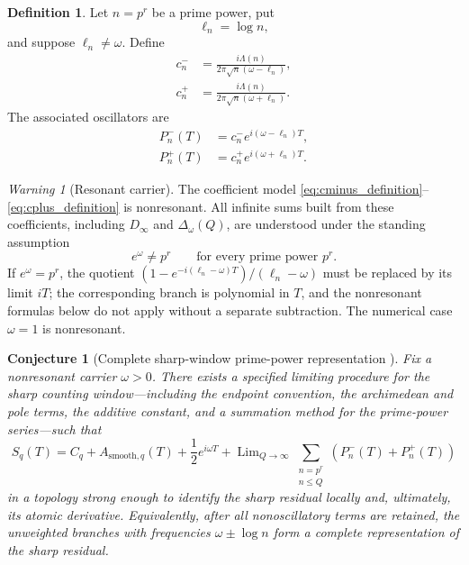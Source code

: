 \documentclass[11pt]{amsart}
\numberwithin{equation}{section}
\theoremstyle{plain}
\newtheorem{conjecture}[theorem]{Conjecture}
\theoremstyle{definition}
\newtheorem{definition}[theorem]{Definition}
\theoremstyle{remark}
\newtheorem{warning}[theorem]{Warning}
\newcommand{\1}{\mathbf{1}}
\begin{document}
\begin{definition}
\label{def:prime_power_coefficients}
Let \(n=p^r\) be a prime power, put
\begin{equation}
\ell_n=\log n,
\label{eq:elln_definition}
\end{equation}
and suppose \(\ell_n\neq\omega\).  Define
\begin{align}
c_n^-
&=
\frac{i\Lambda(n)}
{2\pi\sqrt n(\omega-\ell_n)},
\label{eq:cminus_definition}
\\
c_n^+
&=
\frac{i\Lambda(n)}
{2\pi\sqrt n(\omega+\ell_n)}.
\label{eq:cplus_definition}
\end{align}
The associated oscillators are
\begin{align}
P_n^-(T)
&=
c_n^-e^{i(\omega-\ell_n)T},
\label{eq:Pminus_definition}
\\
P_n^+(T)
&=
c_n^+e^{i(\omega+\ell_n)T}.
\label{eq:Pplus_definition}
\end{align}
\end{definition}

\begin{warning}[Resonant carrier]
\label{warn:prime_power_resonance}
The coefficient model
\eqref{eq:cminus_definition}--\eqref{eq:cplus_definition} is
nonresonant.  All infinite sums built from these coefficients, including
\(D_\infty\) and \(\Delta_\omega(Q)\), are understood under the standing
assumption
\begin{equation}
e^\omega\neq p^r
\qquad
\text{for every prime power }p^r.
\label{eq:nonresonant_carrier_assumption}
\end{equation}
If \(e^\omega=p^r\), the quotient
\((1-e^{-i(\ell_n-\omega)T})/(\ell_n-\omega)\) must be replaced by its
limit \(iT\); the corresponding branch is polynomial in \(T\), and the
nonresonant formulas below do not apply without a separate subtraction.
The numerical case \(\omega=1\) is nonresonant.
\end{warning}

\begin{conjecture}[Complete sharp-window prime-power representation {\normalfont[Conjecture]}]
\label{conj:sharp_window_prime_power_representation}
Fix a nonresonant carrier \(\omega>0\).  There exists a specified limiting
procedure for the sharp counting window---including the endpoint convention,
the archimedean and pole terms, the additive constant, and a summation method
for the prime-power series---such that
\begin{equation}
S_q(T)
=
C_q+
A_{\mathrm{smooth},q}(T)
+
\frac12e^{i\omega T}
+
\mathop{\mathrm{Lim}}_{Q\to\infty}
\sum_{\substack{n=p^r\\ n\leq Q}}
\left(P_n^-(T)+P_n^+(T)\right)
\label{eq:conjectural_sharp_decomposition}
\end{equation}
in a topology strong enough to identify the sharp residual locally and,
ultimately, its atomic derivative.  Equivalently, after all nonoscillatory
terms are retained, the unweighted branches with frequencies
\(\omega\pm\log n\) form a complete representation of the sharp residual.
\end{conjecture}
\end{document}
